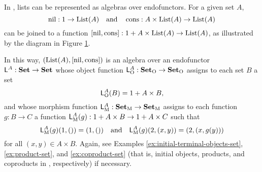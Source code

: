 \begin{example}%
  \label{ex:algebra-lists}


  In \set, lists can be represented as algebras over endofunctors. For
  a given set $A$,
  \begin{equation*}
    \operatorname{nil}: 1 \to \text{List}(A)
    \quad
    \text{and}
    \quad
    \operatorname{cons}: A \times \text{List}(A) \to \text{List}(A)
  \end{equation*}
  can be joined to a function $[\operatorname{nil},\operatorname{cons}]: 1 + A \times \text{List}(A)
  \to \text{List}(A)$, as illustrated by the diagram in Figure
  \ref{fig:coproduct-lists}.
  \begin{figure}[htbp]
    \begin{center}
    \end{center}
    \caption{}
    \label{fig:coproduct-lists}
  \end{figure}
  In this way, $(\text{List}(A),[\operatorname{nil},\operatorname{cons}])$ is an algebra over an
  endofunctor $\mathsf{L}^{A}: \mathbf{Set} \to \mathbf{Set}$ whose object function
  $\mathsf{L}_{\operatorname{O}}^{A}: \mathcal{\mathbf{Set}}_{\operatorname{O}} \to \mathcal{\mathbf{Set}}_{\operatorname{O}}$ assigns to each set $B$
  a set
  \begin{equation}
    \mathsf{L}_{\operatorname{O}}^{A}(B) = 1 + A \times B
    \text{,}
  \end{equation}
  and whose morphism function $\mathsf{L}_{\operatorname{M}}^{A}: \mathcal{\mathbf{Set}}_{\operatorname{M}} \to
  \mathcal{\mathbf{Set}}_{\operatorname{M}}$ assigns to each function $g: B \to C$ a function
  $\mathsf{L}_{\operatorname{M}}^{A}(g): 1 + A \times B \to 1 + A \times C$ such that
  \begin{equation}
    \mathsf{L}_{\operatorname{M}}^{A}(g)(1,()) = (1,())
    \quad
    \text{and}
    \quad
    \mathsf{L}_{\operatorname{M}}^{A}(g)(2,(x,y)) = (2,(x,g(y)))
  \end{equation}
  for all $(x,y) \in A \times B$. Again, see Examples
  \ref{ex:initial-terminal-objects-set}, \ref{ex:product-set}, and
  \ref{ex:coproduct-set} (that is, initial objects, products, and
  coproducts in \set, respectively) if necessary.

\end{example}

